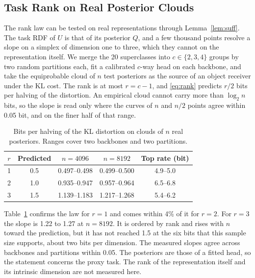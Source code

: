 \documentclass[10pt,journal]{IEEEtran}
\begin{document}
\subsection{Task Rank on Real Posterior Clouds}
The rank law can be tested on real representations through Lemma~\ref{lem:suff}. The task RDF of $U$ is that of its posterior $Q$, and a few thousand points resolve a slope on a simplex of dimension one to three, which they cannot on the representation itself. We merge the 20 superclasses into $c\in\{2,3,4\}$ groups by two random partitions each, fit a calibrated $c$-way head on each backbone, and take the equiprobable cloud of $n$ test posteriors as the source of an object receiver under the KL cost. The rank is at most $r=c-1$, and \eqref{eq:rank} predicts $r/2$ bits per halving of the distortion. An empirical cloud cannot carry more than $\log_2n$ bits, so the slope is read only where the curves of $n$ and $n/2$ points agree within 0.05 bit, and on the finer half of that range.
\begin{table}[t]
\caption{Bits per halving of the KL distortion on clouds of $n$ real posteriors. Ranges cover two backbones and two partitions.}\label{tab:rank}\centering
\begin{tabular}{ccccc}\toprule
$r$ & Predicted & $n=4096$ & $n=8192$ & Top rate (bit)\\\midrule
1 & 0.5 & 0.497--0.498 & 0.499--0.500 & 4.9--5.0\\
2 & 1.0 & 0.935--0.947 & 0.957--0.964 & 6.5--6.8\\
3 & 1.5 & 1.139--1.183 & 1.217--1.268 & 5.4--6.2\\\bottomrule
\end{tabular}\end{table}
Table~\ref{tab:rank} confirms the law for $r=1$ and comes within 4\% of it for $r=2$. For $r=3$ the slope is 1.22 to 1.27 at $n=8192$. It is ordered by rank and rises with $n$ toward the prediction, but it has not reached 1.5 at the six bits that this sample size supports, about two bits per dimension. The measured slopes agree across backbones and partitions within 0.05. The posteriors are those of a fitted head, so the statement concerns the proxy task. The rank of the representation itself and its intrinsic dimension are not measured here.
\end{document}
